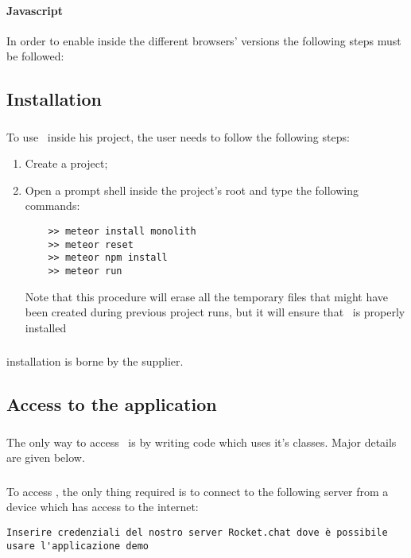 \paragraph{Javascript}
In order to enable  inside the different browsers' versions the following steps must be followed:


\subsection{Installation}
\subsubsection{\progettoShort}
To use \progettoShort\ inside his project, the user needs to follow the following steps:
\begin{enumerate}
	\item Create a  project;
	\item Open a prompt shell inside the project's root and type the following commands:
	\begin{lstlisting}
	>> meteor install monolith
	>> meteor reset
	>> meteor npm install
	>> meteor run
	\end{lstlisting}
	Note that this procedure will erase all the temporary files that might have been created during previous project runs, but it will ensure that \progettoShort\ is properly installed
\end{enumerate}

\subsubsection{\app}
\app installation is borne by the supplier.

\subsection{Access to the application}
\subsubsection{\progettoShort}
The only way to access \progettoShort\ is by writing code which uses it's classes. Major details are given below.

\subsubsection{\app}
To access \app, the only thing required is to connect to the following  server from a device which has access to the internet:
\begin{lstlisting}
Inserire credenziali del nostro server Rocket.chat dove è possibile usare l'applicazione demo
\end{lstlisting}


\newpage